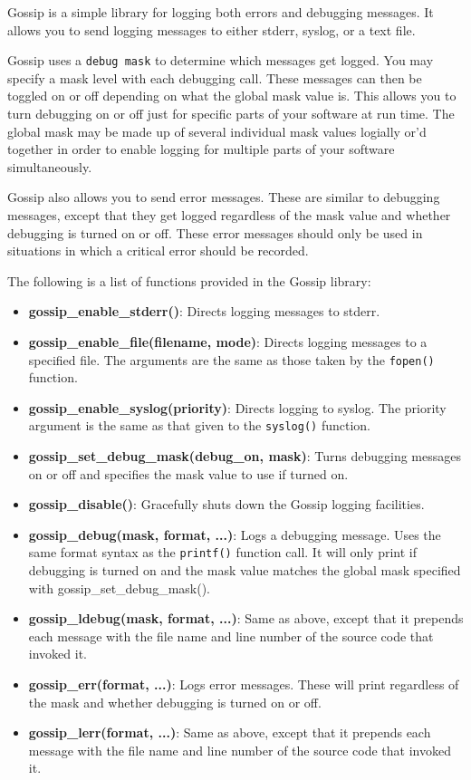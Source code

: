 \documentclass[11pt, letterpaper]{article}
\begin{document}
Gossip is a simple library for logging both errors and debugging messages.
It allows you to send logging messages to either stderr, syslog, or a
text file.  

Gossip uses a {\tt debug mask} to determine which messages get logged.
You may specify a mask level with each debugging call.  These messages
can then be toggled on or off depending on what the global mask value
is.  This allows you to turn debugging on or off just for specific parts of
your software at run time.  The global mask may be made up of several
individual mask values logially or'd together in order to enable logging for
multiple parts of your software simultaneously.

Gossip also allows you to send error messages.  These are similar to
debugging messages, except that they get logged regardless of the mask
value and whether debugging is turned on or off.  These error messages
should only be used in situations in which a critical error should be
recorded.

The following is a list of functions provided in the Gossip library:

\begin{itemize}
	\item \textbf{gossip\_enable\_stderr()}:  Directs logging messages to
	stderr.
	\item \textbf{gossip\_enable\_file(filename, mode)}: Directs logging
	messages to a specified file.  The arguments are the same as those
	taken by the {\tt fopen()} function.
	\item \textbf{gossip\_enable\_syslog(priority)}: Directs logging
	to syslog.  The priority argument is the same as that given to the
	{\tt syslog()} function.
	\item \textbf{gossip\_set\_debug\_mask(debug\_on, mask)}: Turns
	debugging messages on or off and specifies the mask value to use if
	turned on.
	\item \textbf{gossip\_disable()}: Gracefully shuts down the Gossip
	logging facilities.
	\item \textbf{gossip\_debug(mask, format, ...)}: Logs a debugging
	message.  Uses the same format syntax as the {\tt printf()} function
	call.  It will only print if debugging is turned on and the mask
	value matches the global mask specified with
	gossip\_set\_debug\_mask().
	\item \textbf{gossip\_ldebug(mask, format, ...)}: Same as above,
	except that it prepends each message with the file name and line
	number of the source code that invoked it.
	\item \textbf{gossip\_err(format, ...)}: Logs error messages.  These
	will print regardless of the mask and whether debugging is turned on
	or off.
	\item \textbf{gossip\_lerr(format, ...)}: Same as above, except that
	it prepends each message with the file name and line number of the
	source code that invoked it.
	
\end{itemize}
\end{document}
